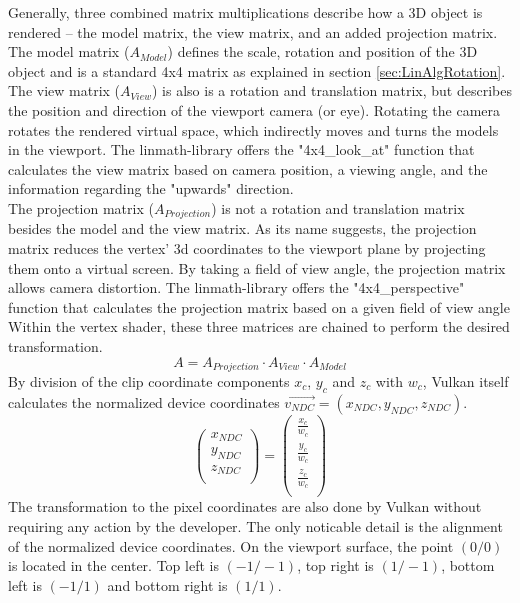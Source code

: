 Generally, three combined matrix multiplications describe how a 3D object is rendered – the model matrix, the view matrix, and an added projection matrix. The model matrix ($A_{Model}$) defines the scale, rotation and position of the 3D object and is a standard 4x4 matrix as explained in section \ref{sec:LinAlgRotation}.\\
The view matrix ($A_{View}$) is also is a rotation and translation matrix, but describes the position and direction of the viewport camera (or eye). Rotating the camera rotates the rendered virtual space, which indirectly moves and turns the models in the viewport. The linmath-library offers the "4x4\_look\_at" function that calculates the view matrix based on camera position, a viewing angle, and the information regarding the "upwards" direction.\\
The projection matrix ($A_{Projection}$)  is not a rotation and translation matrix besides the model and the view matrix. As its name suggests, the projection matrix reduces the vertex' 3d coordinates to the viewport plane by projecting them onto a virtual screen. By taking a field of view angle, the projection matrix allows camera distortion. The linmath-library offers the "4x4\_perspective" function that calculates the projection matrix based on a given field of view angle
Within the vertex shader, these three matrices are chained to perform the desired transformation.
\begin{equation*}
    A = A_{Projection} \cdot A_{View} \cdot A_{Model}
\end{equation*}
By division of the clip coordinate components $x_{c}$, $y_{c}$ and $z_{c}$ with $w_{c}$, Vulkan itself calculates the normalized device coordinates $\overrightarrow{v_{NDC}} = (x_{NDC}, y_{NDC}, z_{NDC})$.
\begin{equation*}
    \begin{pmatrix}
        x_{NDC} \\
        y_{NDC} \\
        z_{NDC} \\
    \end{pmatrix}
    =
    \begin{pmatrix}
        \frac{x_{c}}{w_{c}} \\
        \frac{y_{c}}{w_{c}} \\
        \frac{z_{c}}{w_{c}} \\
    \end{pmatrix}
\end{equation*}
The transformation to the pixel coordinates are also done by Vulkan without requiring any action by the developer. The only noticable detail is the alignment of the normalized device coordinates. On the viewport surface, the point $(0 / 0)$ is located in the center. Top left is $(-1 / -1)$, top right is $(1 / -1)$, bottom left is $(-1 / 1)$ and bottom right is $(1 / 1)$.


